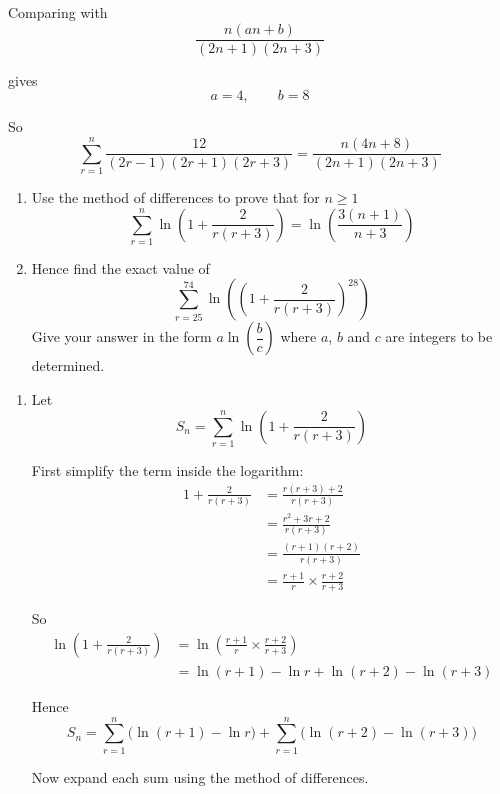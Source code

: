 \documentclass[leqno]{article}
\begin{document}
\begin{enumerate}[
  label=\textbf{\arabic*.},
  leftmargin=*,
  topsep=0pt,
  partopsep=0pt,
  parsep=0pt
]
\begin{djsSolution}
Comparing with
\[
\frac{n(an+b)}{(2n+1)(2n+3)}
\]

gives
\[
a=4,\qquad b=8
\]

So
\[
\sum_{r=1}^{n}\frac{12}{(2r-1)(2r+1)(2r+3)}=\frac{n(4n+8)}{(2n+1)(2n+3)}
\]
\end{djsSolution}


\newpage

\questionitem

\begin{enumerate}[label=\textbf{(\alph*)}]
  \item Use the method of differences to prove that for $n \ge 1$
  \[
  \sum_{r=1}^{n} \ln\left(1+\frac{2}{r(r+3)}\right)=\ln\left(\frac{3(n+1)}{n+3}\right)
  \]
  \item Hence find the exact value of
  \[
  \sum_{r=25}^{74} \ln\left(\left(1+\frac{2}{r(r+3)}\right)^{28}\right)
  \]
  Give your answer in the form $a\ln\left(\dfrac{b}{c}\right)$ where $a$, $b$ and $c$ are integers to be determined.  \\
\end{enumerate}

\vspace*{10pt}

\begin{djsSolution}
\begin{enumerate}[label=\textbf{(\alph*)}]
  \item Let
\[
S_n=\sum_{r=1}^{n}\ln\left(1+\frac{2}{r(r+3)}\right)
\]

First simplify the term inside the logarithm:
\begin{align*}
1+\frac{2}{r(r+3)}
&=\frac{r(r+3)+2}{r(r+3)}\\
&=\frac{r^2+3r+2}{r(r+3)}\\
&=\frac{(r+1)(r+2)}{r(r+3)}\\
&=\frac{r+1}{r}\times\frac{r+2}{r+3}
\end{align*}

So
\begin{align*}
\ln\left(1+\frac{2}{r(r+3)}\right)
&=\ln\left(\frac{r+1}{r}\times\frac{r+2}{r+3}\right)\\
&=\ln(r+1)-\ln r+\ln(r+2)-\ln(r+3)
\end{align*}

Hence
\[
S_n=\sum_{r=1}^{n}\bigl(\ln(r+1)-\ln r\bigr)+\sum_{r=1}^{n}\bigl(\ln(r+2)-\ln(r+3)\bigr)
\]

Now expand each sum using the method of differences.


\end{enumerate}
\end{djsSolution}
\end{enumerate}
\end{document}
